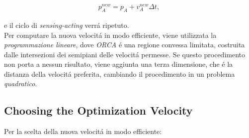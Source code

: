  \begin{gather}
 {p}^{new}_{A} = p_A + v^{new}_A\Delta t,
\end{gather}

e il ciclo di \textit{sensing-acting} verr\'a ripetuto. 
\\Per computare la nuova velocit\'a in modo efficiente, viene utilizzata la \textit{programmazione lineare}, dove \textit{ORCA}\ap{$\tau$} \'e una regione convessa limitata, costruita dalle intersezioni dei semipiani delle velocit\'a permesse. Se questo procedimento non porta a nessun risultato, viene aggiunta una terza dimensione, che \'e la distanza della velocit\'a preferita, cambiando il procedimento in un problema \textit{quadratico}.

\subsection{Choosing the Optimization Velocity}

Per la scelta della nuova  velocit\'a in modo efficiente:

